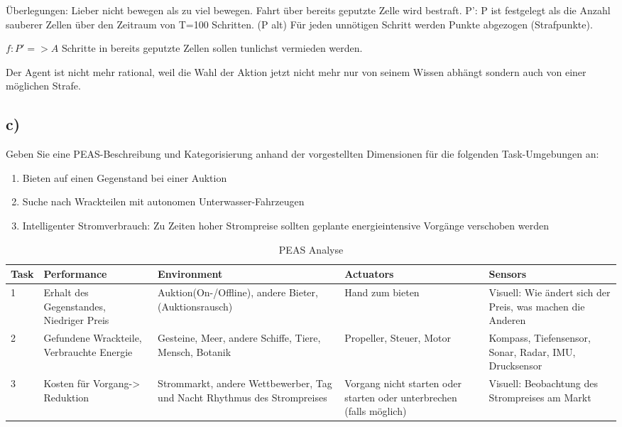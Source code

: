 \documentclass[10pt]{article}%
\theoremstyle{nonumberplain}
\begin{document}
Überlegungen:
Lieber nicht bewegen als zu viel bewegen.
Fahrt über bereits geputzte Zelle wird bestraft.
P':
P ist festgelegt als die Anzahl sauberer Zellen über den Zeitraum von T=100 Schritten. (P alt)
Für jeden unnötigen Schritt werden Punkte abgezogen (Strafpunkte).

$f: P' => A$
Schritte in bereits geputzte Zellen sollen tunlichst vermieden werden.

Der Agent ist nicht mehr rational, weil die Wahl der Aktion jetzt nicht mehr nur von seinem Wissen abhängt sondern auch von einer möglichen Strafe.

\subsection{c)}
Geben Sie eine PEAS-Beschreibung und Kategorisierung anhand der vorgestellten Dimensionen für die folgenden Task-Umgebungen an:
\begin{enumerate}
	\item Bieten auf einen Gegenstand bei einer Auktion
	\item Suche nach Wrackteilen mit autonomen Unterwasser-Fahrzeugen
	\item Intelligenter Stromverbrauch: Zu Zeiten hoher Strompreise sollten geplante energieintensive Vorgänge verschoben werden
\end{enumerate}

\begin{table}
	\centering
	\begin{tabular}{p{0.5cm}|p{3cm}|p{3cm}|p{3cm}|p{3cm}}
		Task  &	Performance & Environment & Actuators & Sensors \\
		\hline
		1 & Erhalt des Gegenstandes, Niedriger Preis & Auktion(On-/Offline), andere Bieter, (Auktionsrausch) & Hand zum bieten & Visuell: Wie ändert sich der Preis, was machen die Anderen \\
		\hline
		2 & Gefundene Wrackteile, Verbrauchte Energie & Gesteine, Meer, andere Schiffe, Tiere, Mensch, Botanik & Propeller, Steuer, Motor & Kompass, Tiefensensor, Sonar, Radar, IMU, Drucksensor \\
		\hline
		3 & Kosten für Vorgang-> Reduktion & Strommarkt, andere Wettbewerber, Tag und Nacht Rhythmus des Strompreises & Vorgang nicht starten oder starten oder unterbrechen (falls möglich) & Visuell: Beobachtung des Strompreises am Markt \\
	\end{tabular}
	\caption{PEAS Analyse}
\end{table}
\end{document}
